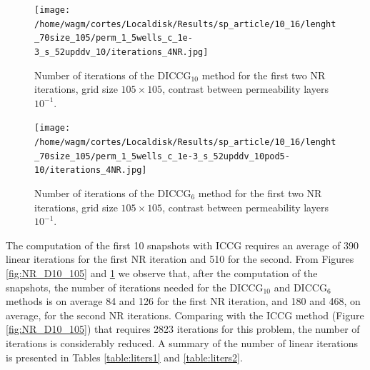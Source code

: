 \documentclass[12pt]{article}
\begin{document}
\begin{figure}[!ht]
\centering
\begin{minipage}{.4\textwidth}
\vspace{-0.4cm}
\hspace{-1cm}
\texttt{[image: /home/wagm/cortes/Localdisk/Results/sp\_article/10\_16/lenght\_70size\_105/perm\_1\_5wells\_c\_1e-3\_s\_52upddv\_10/iterations\_4NR.jpg]}
\vspace{-1.3cm}
\caption{Number of iterations of the DICCG$_{10}$ method for the first two NR iterations, grid size $105\times 105$, contrast between permeability layers $10^{-1}$.}
\label{fig:NR_D10_105}
\end{minipage}%
\hspace{15mm}
\begin{minipage}{.4\textwidth}
\hspace{-1cm}
\texttt{[image: /home/wagm/cortes/Localdisk/Results/sp\_article/10\_16/lenght\_70size\_105/perm\_1\_5wells\_c\_1e-3\_s\_52upddv\_10pod5-10/iterations\_4NR.jpg]}
\vspace{-1.3cm}
\caption{Number of iterations of the DICCG$_{6}$ method for the first two NR iterations, grid size $105\times 105$, contrast between permeability layers $10^{-1}$.}
\label{fig:NR_D6_105}
\end{minipage}

\end{figure}


The computation of the first 10 snapshots with ICCG requires an average of 390 linear iterations for the first
NR iteration and 510 for the second. From Figures \ref{fig:NR_D10_105} and \ref{fig:NR_D6_105} we observe that,
after the computation of the snapshots, the number of iterations needed for the DICCG$_{10}$ and DICCG$_6$ methods
is on average 84 and 126 for the first NR iteration, and 180 and 468, on average, for the second NR iterations. 
Comparing with the ICCG method (Figure \ref{fig:NR_D10_105}) that requires 2823 iterations for this problem, the
number of iterations is considerably reduced. A summary of the number of linear iterations is presented in Tables
\ref{table:liters1} and \ref{table:liters2}.\\
\end{document}
